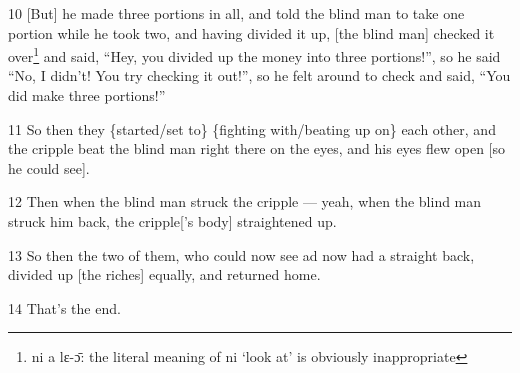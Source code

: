 10 [But] he made three portions in all, and told the blind man to take one portion
while he took two, and having divided it up, [the blind man] checked it over\footnote{ni a lɛ-ɔ̄: the literal meaning of ni `look at' is obviously inappropriate}
and said, ``Hey, you divided up the money into three portions!'', so he said ``No,
I didn't! You try checking it out!'', so he felt around to check and said, ``You
did make three portions!''

11 So then they \{started/set to\} \{fighting with/beating up on\} each other,
and the cripple beat the blind man right there on the eyes, and his eyes flew open
[so he could see].

12 Then when the blind man struck the cripple --- yeah, when the blind man struck
him back, the cripple['s body] straightened up.

13 So then the two of them, who could now see ad now had a straight back, divided
up [the riches] equally, and returned home.

14 That's the end.


